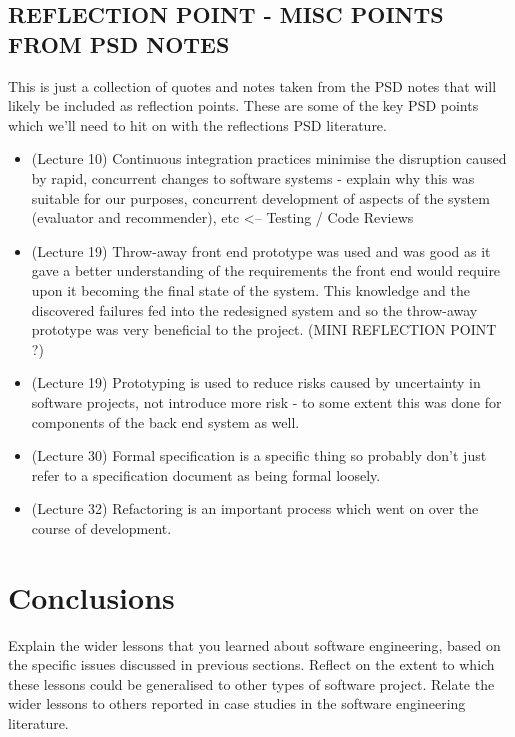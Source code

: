 \documentclass{l3proj}
\begin{document}
\subsection{REFLECTION POINT - MISC POINTS FROM PSD NOTES}
\label{sec:miscpsd}
This is just a collection of quotes and notes taken from the PSD notes that will likely be included as reflection points. These are some of the key PSD points which we'll need to hit on with the reflections PSD literature.
\begin{itemize}
\item (Lecture 10) Continuous integration practices minimise the disruption caused by rapid, concurrent changes to software systems - explain why this was suitable for our purposes, concurrent development of aspects of the system (evaluator and recommender), etc <-- Testing / Code Reviews
\item (Lecture 19) Throw-away front end prototype was used and was good as it gave a better understanding of the requirements the front end would require upon it becoming the final state of the system. This knowledge and the discovered failures fed into the redesigned system and so the throw-away prototype was very beneficial to the project. (MINI REFLECTION POINT ?)
\item (Lecture 19) Prototyping is used to reduce risks caused by uncertainty in software projects, not introduce more risk - to some extent this was done for components of the back end system as well.
\item (Lecture 30) Formal specification is a specific thing so probably don't just refer to a specification document as being formal loosely.
\item (Lecture 32) Refactoring is an important process which went on over the course of development.
\end{itemize}

\section{Conclusions}
\label{sec:conclusions}

Explain the wider lessons that you learned about software engineering,
based on the specific issues discussed in previous sections.  Reflect
on the extent to which these lessons could be generalised to other
types of software project.  Relate the wider lessons to others
reported in case studies in the software engineering literature.



\end{document}
